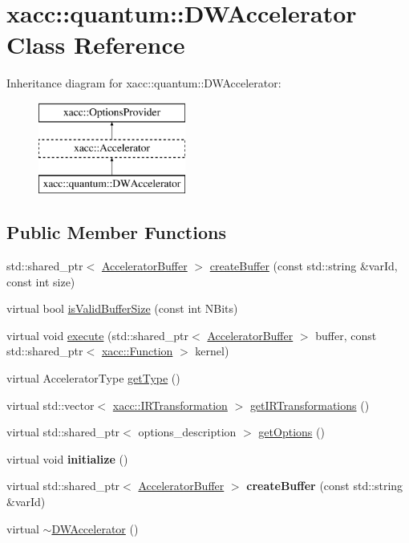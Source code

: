 \hypertarget{a01133}{}\section{xacc\+:\+:quantum\+:\+:D\+W\+Accelerator Class Reference}
\label{a01133}
Inheritance diagram for xacc\+:\+:quantum\+:\+:D\+W\+Accelerator\+:\begin{figure}[H]
\begin{center}
\leavevmode
\includegraphics[height=3.000000cm]{a01133}
\end{center}
\end{figure}
\subsection*{Public Member Functions}
\begin{DoxyCompactItemize}
\item 
std\+::shared\+\_\+ptr$<$ \hyperlink{a01625}{Accelerator\+Buffer} $>$ \hyperlink{a01133_a718d7cb51a35e694d960385e1ea2f99f}{create\+Buffer} (const std\+::string \&var\+Id, const int size)
\item 
virtual bool \hyperlink{a01133_a4c2ee30212a919d8ddf7f9555df25195}{is\+Valid\+Buffer\+Size} (const int N\+Bits)
\item 
virtual void \hyperlink{a01133_aa8d770acb2708b3ee1cd1f21bd0cc668}{execute} (std\+::shared\+\_\+ptr$<$ \hyperlink{a01625}{Accelerator\+Buffer} $>$ buffer, const std\+::shared\+\_\+ptr$<$ \hyperlink{a01653}{xacc\+::\+Function} $>$ kernel)
\item 
virtual Accelerator\+Type \hyperlink{a01133_abe50e427b4bec0460cc238405cb569f9}{get\+Type} ()
\item 
virtual std\+::vector$<$ \hyperlink{a01681}{xacc\+::\+I\+R\+Transformation} $>$ \hyperlink{a01133_a89da20bd079a22d6581ea2da2293b973}{get\+I\+R\+Transformations} ()
\item 
virtual std\+::shared\+\_\+ptr$<$ options\+\_\+description $>$ \hyperlink{a01133_a09926db9f99706307ae6ce5b56845bca}{get\+Options} ()
\item 
\mbox{\label{a01133_a5a7430c43b9d08ceffd0e2cbf6d73e05}} 
virtual void {\bfseries initialize} ()
\item 
\mbox{\label{a01133_add60637a4b3c055e7f2ffa3bf8e320ac}} 
virtual std\+::shared\+\_\+ptr$<$ \hyperlink{a01625}{Accelerator\+Buffer} $>$ {\bfseries create\+Buffer} (const std\+::string \&var\+Id)
\item 
virtual \hyperlink{a01133_ad06f92a271d445c2a1ff8364faa3617b}{$\sim$\+D\+W\+Accelerator} ()
\end{DoxyCompactItemize}

